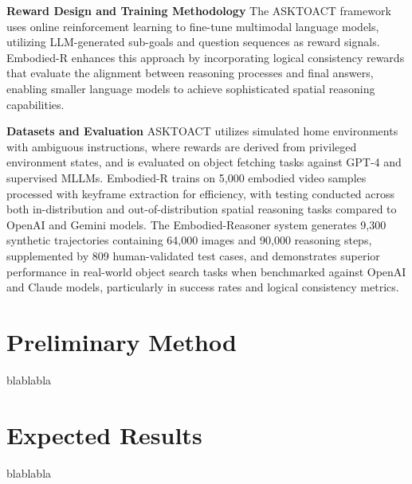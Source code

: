 \documentclass[10pt,twocolumn]{article}
\begin{document}
\textbf{Reward Design and Training Methodology}
The ASKTOACT framework uses online reinforcement learning to fine-tune multimodal language models, utilizing LLM-generated sub-goals and question sequences as reward signals. Embodied-R enhances this approach by incorporating logical consistency rewards that evaluate the alignment between reasoning processes and final answers, enabling smaller language models to achieve sophisticated spatial reasoning capabilities. 

\textbf{Datasets and Evaluation} 
ASKTOACT utilizes simulated home environments with ambiguous instructions, where rewards are derived from privileged environment states, and is evaluated on object fetching tasks against GPT-4 and supervised MLLMs. Embodied-R trains on 5,000 embodied video samples processed with keyframe extraction for efficiency, with testing conducted across both in-distribution and out-of-distribution spatial reasoning tasks compared to OpenAI and Gemini models. The Embodied-Reasoner system generates 9,300 synthetic trajectories containing 64,000 images and 90,000 reasoning steps, supplemented by 809 human-validated test cases, and demonstrates superior performance in real-world object search tasks when benchmarked against OpenAI and Claude models, particularly in success rates and logical consistency metrics.

\section*{Preliminary Method}
blablabla
\section*{Expected Results}
blablabla

\printbibliography[title=References]
\end{document}
